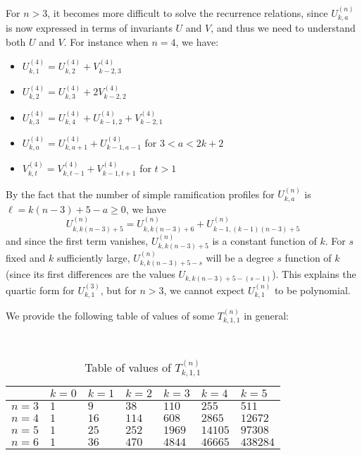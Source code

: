 \documentclass[thesis]{thesis-umich}           %
\theoremstyle{definition}
\newtheorem{prop}[thm]{Proposition}
\begin{document}
For $n>3$, it becomes more difficult to solve the recurrence relations,
since $U_{k,a}^{(n)}$ is now expressed in terms of invariants $U$ and $V$,
and thus we need to understand both $U$ and $V$.
For instance when $n=4$, we have:
\begin{itemize}
\item $U_{k,1}^{(4)}=U_{k,2}^{(4)}+V_{k-2,3}^{(4)}$
\item $U_{k,2}^{(4)}=U_{k,3}^{(4)}+2V_{k-2,2}^{(4)}$
  \item $U_{k,3}^{(4)}=U_{k,4}^{(4)}+U_{k-1,2}^{(4)}+V_{k-2,1}^{(4)}$
\item $U_{k,a}^{(4)}=U_{k,a+1}^{(4)}+U_{k-1,a-1}^{(4)}$ for $3<a<2k+2$
  \item $V_{k,t}^{(4)}=V_{k,t-1}^{(4)}+V_{k-1,t+1}^{(4)}$ for $t>1$
\end{itemize}
By the fact that the number of simple ramification profiles
for $U_{k,a}^{(n)}$ is
$\ell=k(n-3)+5-a\geq 0$, we have
\[
U_{k,k(n-3)+5}^{(n)}=U_{k,k(n-3)+6}^{(n)}+U_{k-1,(k-1)(n-3)+5}^{(n)}
\]
and since the first term vanishes, $U_{k,k(n-3)+5}^{(n)}$ is a constant
function of $k$. For $s$ fixed and $k$
sufficiently large, $U_{k,k(n-3)+5-s}^{(n)}$ will be a degree $s$ function
of $k$ (since its first differences are the values $U_{k,k(n-3)+5-(s-1)}$).
This explains the quartic form for $U_{k,1}^{(3)}$, but
for $n>3$, we cannot expect $U_{k,1}^{(n)}$ to be polynomial.

\iffalse
The last equation yields the following result:
\begin{prop}
  For $k\geq 0$ and $t>1$,
  \[
  V_{k,t}^{(4)}=a_0(t)V_{k,1}^{(4)}+a_1(t)V_{k-1,1}^{(4)}+a_2(t)V_{k-2,1}^{(4)}+\dots+a_{k-1}(t)V_{1,1}^{(4)}+a_k(t)V_{0,1}^{(4)}=\sum_{n=0}^k a_n(t)V_{k-n,1}^{(4)}
  \]
  where
  \[
  a_k(t)=\#\{(r_1,\dots,r_k):r_k\leq t+1,\ 3\leq r_i\leq r_{i+1}+1\text{ for }1\leq i<k\}
  \]
\end{prop}
\begin{proof}
  TODO
\end{proof}
\fi

We provide the following table of values of some $T_{k,1,1}^{(n)}$ in general:

  \begin{table}[h]
    \caption{Table of values of $T_{k,1,1}^{(n)}$}
    \centering
    ~\\
  \begin{tabular}{l|l|l|l|l|l|l|}
    & $k=0$ & $k=1$ & $k=2$ & $k=3$ & $k=4$ & $k=5$ \\ \hline
    $n=3$ & $1$ & $9$ & $38$ & $110$ & $255$ & $511$ \\ \hline
    $n=4$ & $1$ & $16$ & $114$ & $608$ & $2865$ & $12672$ \\ \hline
    $n=5$ & $1$ & $25$ & $252$ & $1969$ & $14105$ & $97308$ \\ \hline
    $n=6$ & $1$ & $36$ & $470$ & $4844$ & $46665$ & $438284$ \\ \hline
\end{tabular}
  \end{table}
\end{document}
